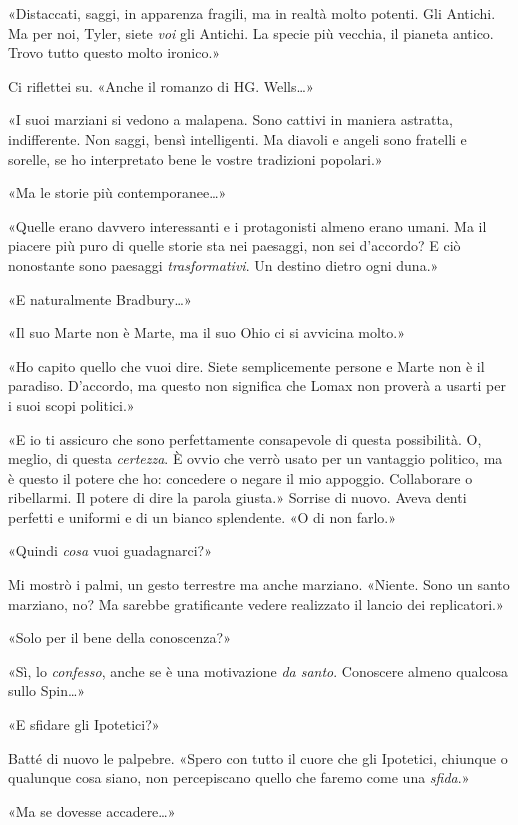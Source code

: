 «Distaccati, saggi, in apparenza fragili, ma in realtà molto potenti.
Gli Antichi. Ma per noi, Tyler, siete \emph{voi} gli Antichi. La specie
più vecchia, il pianeta antico. Trovo tutto questo molto ironico.»

Ci riflettei su. «Anche il romanzo di HG. Wells\ldots»

«I suoi marziani si vedono a malapena. Sono cattivi in maniera astratta,
indifferente. Non saggi, bensì intelligenti. Ma diavoli e angeli sono
fratelli e sorelle, se ho interpretato bene le vostre tradizioni
popolari.»

«Ma le storie più contemporanee\ldots»

«Quelle erano davvero interessanti e i protagonisti almeno erano umani.
Ma il piacere più puro di quelle storie sta nei paesaggi, non sei
d'accordo? E ciò nonostante sono paesaggi \emph{trasformativi}. Un
destino dietro ogni duna.»

«E naturalmente Bradbury\ldots»

«Il suo Marte non è Marte, ma il suo Ohio ci si avvicina molto.»

«Ho capito quello che vuoi dire. Siete semplicemente persone e Marte non
è il paradiso. D'accordo, ma questo non significa che Lomax non proverà
a usarti per i suoi scopi politici.»

«E io ti assicuro che sono perfettamente consapevole di questa
possibilità. O, meglio, di questa \emph{certezza}. È ovvio che verrò
usato per un vantaggio politico, ma è questo il potere che ho: concedere
o negare il mio appoggio. Collaborare o ribellarmi. Il potere di dire la
parola giusta.» Sorrise di nuovo. Aveva denti perfetti e uniformi e di
un bianco splendente. «O di non farlo.»

«Quindi \emph{cosa} vuoi guadagnarci?»

Mi mostrò i palmi, un gesto terrestre ma anche marziano. «Niente. Sono
un santo marziano, no? Ma sarebbe gratificante vedere realizzato il
lancio dei replicatori.»

«Solo per il bene della conoscenza?»

«Sì, lo \emph{confesso}, anche se è una motivazione \emph{da santo}.
Conoscere almeno qualcosa sullo Spin\ldots»

«E sfidare gli Ipotetici?»

Batté di nuovo le palpebre. «Spero con tutto il cuore che gli Ipotetici,
chiunque o qualunque cosa siano, non percepiscano quello che faremo come
una \emph{sfida}.»

«Ma se dovesse accadere\ldots»

